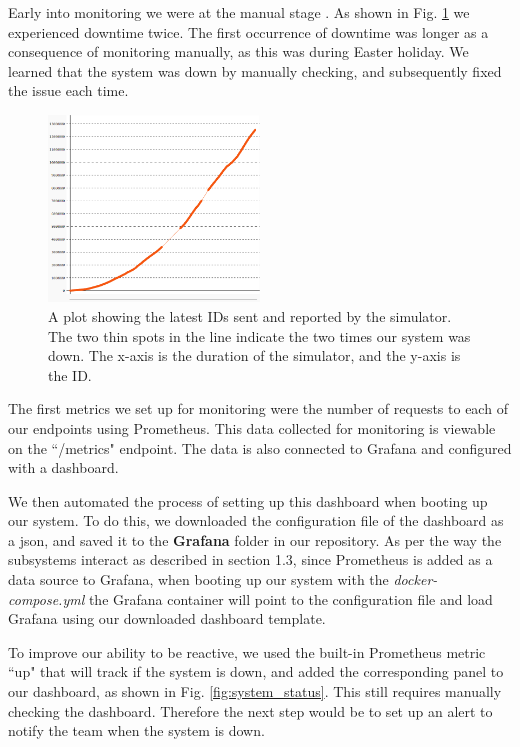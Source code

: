 Early into monitoring we were at the manual stage \cite{monitor_stages}. As shown in Fig. \ref{fig:latest_ids} we experienced downtime twice. The first occurrence of downtime was longer as a consequence of monitoring manually, as this was during Easter holiday. We learned that the system was down by manually checking, and subsequently fixed the issue each time.

\begin{figure}[H]%
\begin {center}
\includegraphics[width=0.5\textwidth]{figures/latest_ids.png}
\caption{A plot showing the latest IDs sent and reported by the simulator. The two thin spots in the line indicate the two times our system was down. The x-axis is the duration of the simulator, and the y-axis is the ID.}
\label{fig:latest_ids}
\end {center}
\end{figure}

The first metrics we set up for monitoring were the number of requests to each of our endpoints using Prometheus. This data collected for monitoring is viewable on the ``/metrics" endpoint. The data is also connected to Grafana and configured with a dashboard. 

We then automated the process of setting up this dashboard when booting up our system. To do this, we downloaded the configuration file of the dashboard as a json, and saved it to the \textbf{Grafana} folder in our repository. As per the way the subsystems interact as described in section 1.3, since Prometheus is added as a data source to Grafana, when booting up our system with the \textit{docker-compose.yml} the Grafana container will point to the configuration file and load Grafana using our downloaded dashboard template.

To improve our ability to be reactive, we used the built-in Prometheus metric ``up" that will track if the system is down, and added the corresponding panel to our dashboard, as shown in Fig. \ref{fig:system_status}. This still requires manually checking the dashboard. Therefore the next step would be to set up an alert to notify the team when the system is down.

